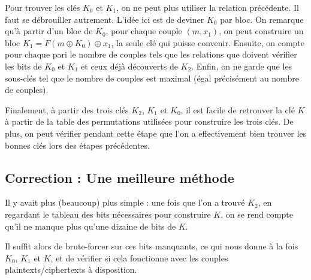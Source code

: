 Pour trouver les clés $K_0$ et $K_1$, on ne peut plus utiliser la relation précédente. Il faut se débrouiller autrement. L'idée ici est de deviner $K_0$ par bloc. On remarque qu'à partir d'un bloc de $K_0$, pour chaque couple $(m,x_1)$, on peut construire un bloc $K_1 = F(m \oplus K_0) \oplus x_1$, la seule clé qui puisse convenir. Ensuite, on compte pour chaque pari le nombre de couples tels que les relations que doivent vérifier les bits de $K_0$ et $K_1$ et ceux déjà découverts de $K_2$. Enfin, on ne garde que les sous-clés tel que le nombre de couples est maximal (égal précisément au nombre de couples).	

Finalement, à partir des trois clés $K_2$, $K_1$ et $K_0$, il est facile de retrouver la clé $K$ à partir de la table des permutations utilisées pour construire les trois clés. De plus, on peut vérifier pendant cette étape que l'on a effectivement bien trouver les bonnes clés lors des étapes précédentes.

\subsection*{Correction : Une meilleure méthode}

Il y avait plus (beaucoup) plus simple : une fois que l'on a trouvé $K_2$, en regardant le tableau des bits nécessaires pour construire $K$, on se rend compte qu'il ne manque plus qu'une dizaine de bits de $K$.

Il suffit alors de brute-forcer sur ces bits manquants, ce qui nous donne à la fois $K_0$, $K_1$ et $K$, et de vérifier si cela fonctionne avec les couples plaintexts/ciphertexts à disposition.



